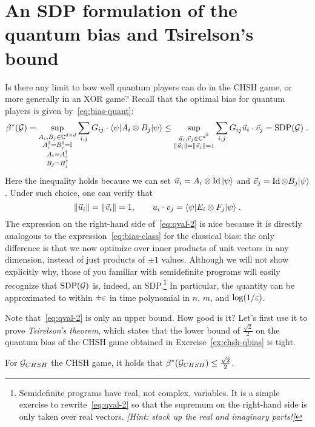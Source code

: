 \section{An SDP formulation of the quantum bias and Tsirelson's bound}
\label{sec:sdp-tsirelson}

Is there any limit to how well quantum players can do in the CHSH game, or more generally in an XOR game? Recall that the optimal bias for quantum players is given by~\eqref{eq:bias-quant}:
\begin{equation}\label{eq:qval-2}
\beta^*(\mathcal{G})=\sup_{\substack{A_i,B_j\in\mathbb{C}^{d\times d}\\ A_i^2=B_j^2=\mathbb{I}\\ A_i=A_i^\dagger\\ B_j=B_j^\dagger}}\sum_{i,j} G_{ij}\cdot\langle\psi| A_i\otimes B_j|\psi\rangle \le \sup_{\substack{\vec{u}_i,\vec{v}_j\in \mathbb{C}^{d^2}\\ \|\vec{u}_i\|=\|\vec{v}_j\|=1}}\sum_{i,j} G_{ij}\vec{u}_i\cdot \vec{v}_j = \text{SDP}(\mathcal{G})\;.
\end{equation}
Here the inequality holds because we can set $\vec{u}_i=A_i \otimes \mathop{\rm Id}\nolimits |\psi\rangle$ and $\vec{v}_j=\mathop{\rm Id}\nolimits\otimes B_j |\psi\rangle$. Under such choice, one can verify that
$$
\|\vec{u}_i\|=\|\vec{v}_i\|=1,\qquad 
u_i\cdot v_j=\langle\psi| E_i \otimes F_j |\psi\rangle\;.
$$
The expression on the right-hand side of~\eqref{eq:qval-2} is nice because it is directly analogous to the expression~\eqref{eq:bias-class} for the classical bias: the only difference is that we now optimize over inner products of unit vectors in any dimension, instead of just products of $\pm 1$ values. Although we will not show explicitly why, those of you familiar with semidefinite programs will easily recognize that $\text{SDP}(\mathcal{G})$ is, indeed, an SDP.\footnote{Semidefinite programs have real, not complex, variables. It is a simple exercise to rewrite~\eqref{eq:qval-2} so that the supremum on the right-hand side is only taken over real vectors. \emph{[Hint: stack up the real and imaginary parts!]}} In particular, the quantity can be approximated to within $\pm\varepsilon$ in time polynomial in $n$, $m$, and $\log(1/\varepsilon)$. 


Note that~\eqref{eq:qval-2} is only an upper bound. How good is it? Let's first use it to prove \emph{Tsirelson's theorem}, which states that the lower bound of $\frac{\sqrt{2}}{2}$ on the quantum bias of the CHSH game obtained in Exercise~\ref{ex:chsh-qbias} is tight. 

\begin{theorem}[Tsirelson]\label{thm:tsirelson}
For $\mathcal{G}_{CHSH}$ the CHSH game, it holds that $\beta^*(\mathcal{G}_{CHSH}) \leq \frac{\sqrt{2}}{2}$.
\end{theorem}

